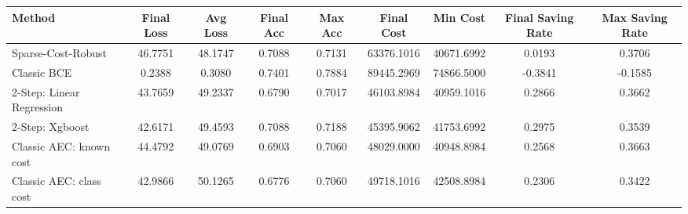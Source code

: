 \begin{tabular}{lcccccccc}
\toprule
Method & Final Loss & Avg Loss & Final Acc & Max Acc & Final Cost & Min Cost & Final Saving Rate & Max Saving Rate \\
\midrule
Sparse-Cost-Robust & 46.7751 & 48.1747 & 0.7088 & 0.7131 & 63376.1016 & 40671.6992 & 0.0193 & 0.3706 \\
Classic BCE & 0.2388 & 0.3080 & 0.7401 & 0.7884 & 89445.2969 & 74866.5000 & -0.3841 & -0.1585 \\
2-Step: Linear Regression & 43.7659 & 49.2337 & 0.6790 & 0.7017 & 46103.8984 & 40959.1016 & 0.2866 & 0.3662 \\
2-Step: Xgboost & 42.6171 & 49.4593 & 0.7088 & 0.7188 & 45395.9062 & 41753.6992 & 0.2975 & 0.3539 \\
Classic AEC: known cost & 44.4792 & 49.0769 & 0.6903 & 0.7060 & 48029.0000 & 40948.8984 & 0.2568 & 0.3663 \\
Classic AEC: class cost & 42.9866 & 50.1265 & 0.6776 & 0.7060 & 49718.1016 & 42508.8984 & 0.2306 & 0.3422 \\
\bottomrule
\end{tabular}
